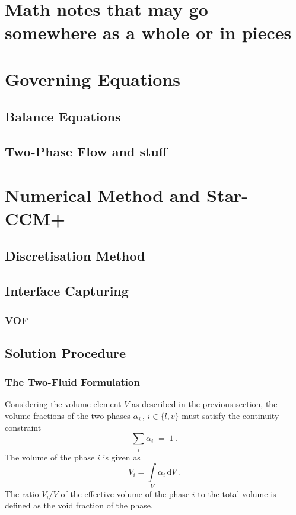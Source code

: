 \section{Math notes that may go somewhere as a whole or in pieces}



\section{Governing Equations}
\subsection{Balance Equations}
\subsection{Two-Phase Flow and stuff}

\section{Numerical Method and Star-CCM+}
\subsection{Discretisation Method}
\subsection{Interface Capturing}
\subsubsection{VOF}
\subsection{Solution Procedure}
\subsubsection{The Two-Fluid Formulation}\label{sec:two-fluid}
Considering the volume element $V$ as described in the previous section, 
 the volume fractions of the two phases $\alpha_{i}\,,\,i \in \{l,v\}$ must satisfy the continuity constraint 
 \begin{equation}\label{eq:vol-frac-cont}
  \sum_{i}\alpha_{i}\;=\;1\,.
 \end{equation}
 The volume of the phase $i$ is given as 
 \begin{equation}
  V_{i} = \int\limits_{V} \alpha_{i}\,\mathrm{d}V\,.
 \end{equation}
 The ratio $V_{i}/V$ of the effective volume of the phase $i$ to the total volume is defined as 
 the void fraction of the phase. 
 
